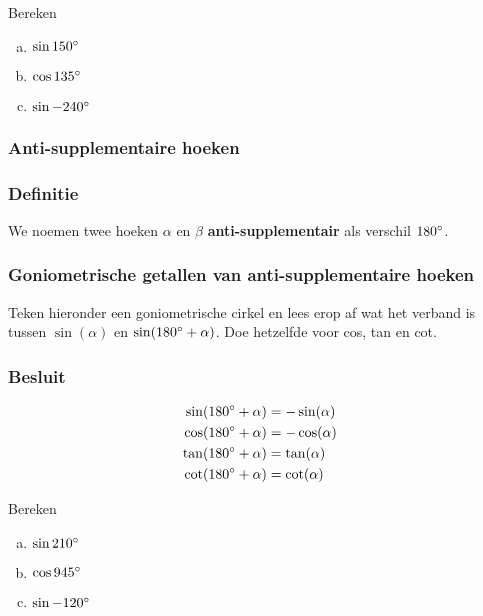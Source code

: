 \documentclass[twoside,a4paper,12pt]{article}
\begin{document}
\begin{oefening}
Bereken
\begin{enumerate}[(a)]
  \itemsep0.5em
  \item $\sin150^\circ$
  \item $\cos135^\circ$
  \item $\sin-240^\circ$
\end{enumerate}
\end{oefening}

\subsubsection{Anti-supplementaire hoeken}

\subsubsection*{Definitie}
We noemen twee hoeken $\alpha$ en $\beta$ \textbf{anti-supplementair} als verschil $180^\circ$.

\subsubsection*{Goniometrische getallen van anti-supplementaire hoeken}
Teken hieronder een goniometrische cirkel en lees erop af wat het verband is tussen $\sin(\alpha)$ en $\sin(180^\circ+\alpha)$. Doe hetzelfde voor cos, tan en cot.
\vspace*{6cm}

\subsubsection*{Besluit}
\begin{align*}
\sin(180^\circ+\alpha)&=-\sin(\alpha)\\
\cos(180^\circ+\alpha)&=-\cos(\alpha)\\
\tan(180^\circ+\alpha)&=\tan(\alpha)\\
\cot(180^\circ+\alpha)&=\cot(\alpha)
\end{align*}

\begin{oefening}
Bereken
\begin{enumerate}[(a)]
  \itemsep0.5em
  \item $\sin210^\circ$
  \item $\cos945^\circ$
  \item $\sin-120^\circ$
\end{enumerate}
\end{oefening}
\end{document}
